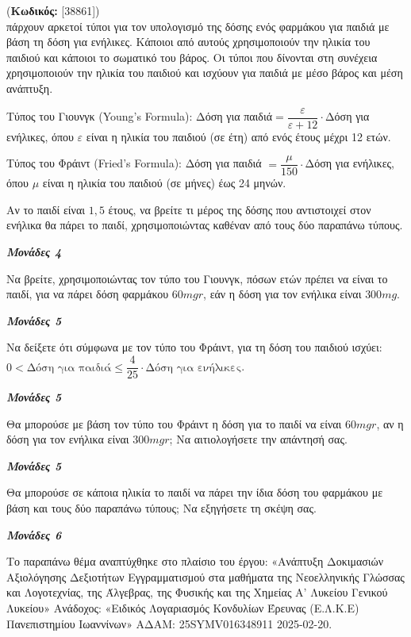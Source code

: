\documentclass[11pt,a4paper,twoside]{book}
\newcounter{askhsh}[chapter]
\renewcommand{\theaskhsh}{
	\bf{\titlefont{\Large{\thechapter}}.\arabic{askhsh}}
}
\newcommand{\Askhsh}[2]{\refstepcounter{askhsh}{\titlefont{Άσκηση\theaskhsh} - \textcolor{maincolor}{ΘΕΜΑ #2}} (\small{\textbf{Κωδικός:} #1})\\}{}
\newcommand{\monades}[1]{
\hspace*{\fill}
\textbf{\textit{\textcolor{maincolor}{Μονάδες #1}}}}
\begin{document}
\vspace{4mm}

\Askhsh{[38861]}
Υπάρχουν αρκετοί τύποι για τον υπολογισμό της δόσης ενός φαρμάκου για παιδιά με βάση τη δόση για ενήλικες. Κάποιοι από αυτούς χρησιμοποιούν την ηλικία του παιδιού και κάποιοι το σωματικό του βάρος. Οι τύποι που δίνονται στη συνέχεια χρησιμοποιούν την ηλικία του παιδιού και ισχύουν για παιδιά με μέσο βάρος και μέση ανάπτυξη.

Τύπος του Γιουνγκ (Young's Formula): Δόση για παιδιά$ = \dfrac{\varepsilon}{\varepsilon + 12} \cdot $Δόση για ενήλικες, όπου $\varepsilon$ είναι η ηλικία του παιδιού (σε έτη) από ενός έτους μέχρι 12 ετών.

Τύπος του Φράιντ (Fried's Formula): Δόση για παιδιά $ = \dfrac{\mu}{150} \cdot $Δόση για ενήλικες, όπου $\mu$ είναι η ηλικία του παιδιού (σε μήνες) έως 24 μηνών.
\begin{alist}
\item Αν το παιδί είναι $1,5$ έτους, να βρείτε τι μέρος της δόσης που αντιστοιχεί στον ενήλικα θα πάρει το παιδί, χρησιμοποιώντας καθέναν από τους δύο παραπάνω τύπους.
\monades{4}
\item
\begin{rlist}
\item Να βρείτε, χρησιμοποιώντας τον τύπο του Γιουνγκ, πόσων ετών πρέπει να είναι το παιδί, για να πάρει δόση φαρμάκου $60\si{mgr}$, εάν η δόση για τον ενήλικα είναι $300\si{mg}$.
\monades{5}
\item Να δείξετε ότι σύμφωνα με τον τύπο του Φράιντ, για τη δόση του παιδιού ισχύει:
$0 < \text{Δόση για παιδιά} \leq \dfrac{4}{25} \cdot \text{Δόση για ενήλικες}$.
\monades{5}
\item Θα μπορούσε με βάση τον τύπο του Φράιντ η δόση για το παιδί να είναι $60\si{mgr}$, αν η δόση για τον ενήλικα είναι $300\si{mgr}$; Να αιτιολογήσετε την απάντησή σας.
\monades{5}
\end{rlist}
\item Θα μπορούσε σε κάποια ηλικία το παιδί να πάρει την ίδια δόση του φαρμάκου με βάση και τους δύο παραπάνω τύπους; Να εξηγήσετε τη σκέψη σας.
\monades{6}

{\footnotesize Το παραπάνω θέμα αναπτύχθηκε στο πλαίσιο του έργου: «Ανάπτυξη Δοκιμασιών Αξιολόγησης Δεξιοτήτων Εγγραμματισμού στα μαθήματα της Νεοελληνικής Γλώσσας και Λογοτεχνίας, της Άλγεβρας, της Φυσικής και της Χημείας Α' Λυκείου Γενικού Λυκείου» Ανάδοχος: «Ειδικός Λογαριασμός Κονδυλίων Έρευνας (Ε.Λ.Κ.Ε) Πανεπιστημίου Ιωαννίνων» ΑΔΑΜ: 25SYMV016348911 2025-02-20.}
\end{alist}
\vspace{4mm}
\end{document}
